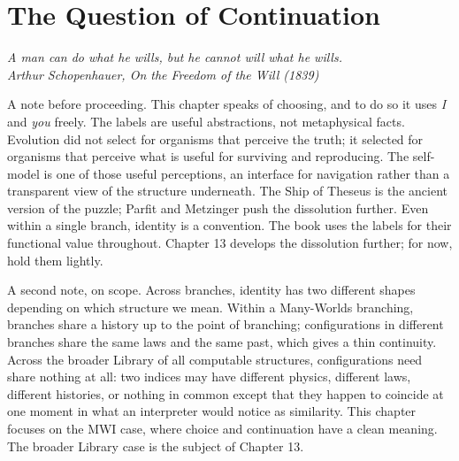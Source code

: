 \chapter{The Question of Continuation}

\vspace{1em}
\hfill
\begin{minipage}[c]{0.55\textwidth}
\raggedleft
\small\itshape
A man can do what he wills, but he cannot will what he wills.\\[0.5em]
\upshape\footnotesize Arthur Schopenhauer, \textit{On the Freedom of the Will} (1839)
\end{minipage}%
\hspace{0.5em}
\begin{minipage}[c]{0.12\textwidth}
\end{minipage}
\vspace{1.5em}

\noindent A note before proceeding. This chapter speaks of choosing, and to do so it uses \emph{I} and \emph{you} freely. The labels are useful abstractions, not metaphysical facts. Evolution did not select for organisms that perceive the truth; it selected for organisms that perceive what is useful for surviving and reproducing. The self-model is one of those useful perceptions, an interface for navigation rather than a transparent view of the structure underneath. The Ship of Theseus is the ancient version of the puzzle; Parfit and Metzinger push the dissolution further. Even within a single branch, identity is a convention. The book uses the labels for their functional value throughout. Chapter 13 develops the dissolution further; for now, hold them lightly.

\medskip

A second note, on scope. Across branches, identity has two different shapes depending on which structure we mean. Within a Many-Worlds branching, branches share a history up to the point of branching; configurations in different branches share the same laws and the same past, which gives a thin continuity. Across the broader Library of all computable structures, configurations need share nothing at all: two indices may have different physics, different laws, different histories, or nothing in common except that they happen to coincide at one moment in what an interpreter would notice as similarity. This chapter focuses on the MWI case, where choice and continuation have a clean meaning. The broader Library case is the subject of Chapter 13.

